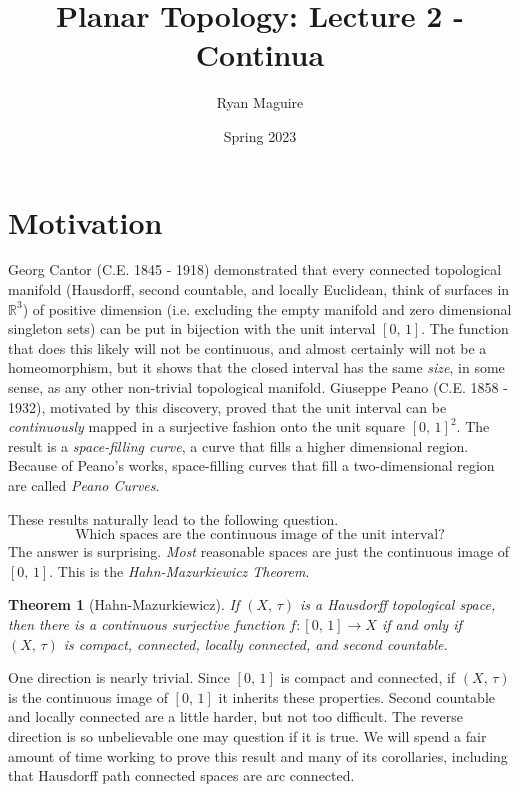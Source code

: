 \documentclass{article}
\title{Planar Topology: Lecture 2 - Continua}
\author{Ryan Maguire}
\date{Spring 2023}
\theoremstyle{plain}
\newtheorem{theorem}{Theorem}[section]
\theoremstyle{normal}
\begin{document}
    \maketitle
    \tableofcontents
    \listoffigures
    \section{Motivation}
        Georg Cantor (C.E. 1845 - 1918)
        demonstrated that every connected topological
        manifold (Hausdorff, second countable, and locally Euclidean, think of
        surfaces in $\mathbb{R}^{3}$) of positive dimension (i.e. excluding
        the empty manifold and zero dimensional singleton sets) can be put in
        bijection with the unit interval $[0,\,1]$. The function that does this
        likely will not be continuous, and almost certainly will not be a
        homeomorphism, but it shows that the closed interval has the same
        \textit{size}, in some sense, as any other non-trivial
        topological manifold.
        Giuseppe Peano (C.E. 1858 - 1932), motivated by
        this discovery, proved that the unit interval can be
        \textit{continuously} mapped in a surjective fashion onto the unit
        square $[0,\,1]^{2}$. The result is a
        \textit{space-filling curve}, a curve
        that fills a higher dimensional region. Because of Peano's works,
        space-filling curves that fill a two-dimensional region are called
        \textit{Peano Curves}.
        \par\hfill\par
        These results naturally lead to the following question.
        \begin{equation}
            \textrm{Which spaces are the continuous image of the unit interval?}
        \end{equation}
        The answer is surprising. \textit{Most} reasonable spaces
        are just the continuous image of $[0,\,1]$. This is the
        \textit{Hahn-Mazurkiewicz Theorem}.
        \begin{theorem}[Hahn-Mazurkiewicz]
            If $(X,\,\tau)$ is a Hausdorff topological space, then there is a
            continuous surjective function $f:[0,\,1]\rightarrow{X}$ if and
            only if $(X,\,\tau)$ is compact, connected, locally connected, and
            second countable.
        \end{theorem}
        One direction is nearly trivial. Since $[0,\,1]$ is compact and
        connected, if $(X,\,\tau)$ is the continuous image of $[0,\,1]$ it
        inherits these properties. Second countable and locally connected are
        a little harder, but not too difficult. The
        reverse direction is so unbelievable one may question if it is true.
        We will spend a fair amount of time working to prove this result and
        many of its corollaries, including that Hausdorff path connected spaces
        are arc connected.
\end{document}
